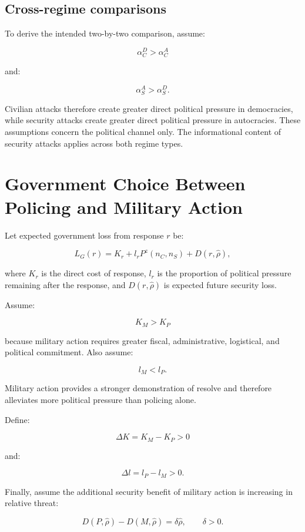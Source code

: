 \documentclass[
  letterpaper,
  DIV=11,
  numbers=noendperiod]{scrartcl}
\begin{document}
\subsection{Cross-regime comparisons}\label{cross-regime-comparisons}

To derive the intended two-by-two comparison, assume:

\[
\boxed{\alpha_C^D>\alpha_C^A}
\tag{A4}
\]

and:

\[
\boxed{\alpha_S^A>\alpha_S^D.}
\tag{A5}
\]

Civilian attacks therefore create greater direct political pressure in
democracies, while security attacks create greater direct political
pressure in autocracies. These assumptions concern the political channel
only. The informational content of security attacks applies across both
regime types.

\section{Government Choice Between Policing and Military
Action}\label{government-choice-between-policing-and-military-action}

Let expected government loss from response \(r\) be:

\[
L_G(r)
=
K_r+l_rP^z(n_C,n_S)+D(r,\widehat{\rho}),
\tag{16}
\]

where \(K_r\) is the direct cost of response, \(l_r\) is the proportion
of political pressure remaining after the response, and
\(D(r,\widehat{\rho})\) is expected future security loss.

Assume:

\[
K_M>K_P
\tag{A6}
\]

because military action requires greater fiscal, administrative,
logistical, and political commitment. Also assume:

\[
l_M<l_P.
\tag{A7}
\]

Military action provides a stronger demonstration of resolve and
therefore alleviates more political pressure than policing alone.

Define:

\[
\Delta K=K_M-K_P>0
\]

and:

\[
\Delta l=l_P-l_M>0.
\]

Finally, assume the additional security benefit of military action is
increasing in relative threat:

\[
D(P,\widehat{\rho})-D(M,\widehat{\rho})
=
\delta\widehat{\rho},
\qquad
\delta>0.
\tag{17}
\]
\end{document}
